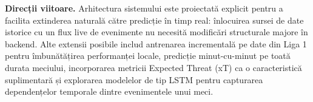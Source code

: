 \textbf{Direcții viitoare.} Arhitectura sistemului este proiectată explicit 
pentru a facilita extinderea naturală către predicție în timp real: înlocuirea 
sursei de date istorice cu un flux live de evenimente nu necesită modificări 
structurale majore în backend. Alte extensii posibile includ antrenarea 
incrementală pe date din Liga 1 pentru îmbunătățirea performanței locale, 
predicție minut-cu-minut pe toată durata meciului, incorporarea metricii 
Expected Threat (xT) ca o caracteristică suplimentară \cite{Singh2019} și explorarea 
modelelor de tip LSTM pentru capturarea dependențelor temporale dintre 
evenimentele unui meci.